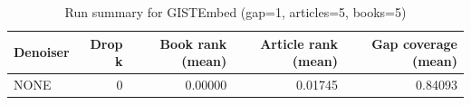 \begin{table}
\caption{Run summary for GISTEmbed (gap=1, articles=5, books=5)}
\label{tab:summary_gap1_gistembed_a5_b5}
\begin{tabular}{lrrrr}
\toprule
Denoiser & Drop k & Book rank (mean) & Article rank (mean) & Gap coverage (mean) \\
\midrule
NONE & 0 & 0.00000 & 0.01745 & 0.84093 \\
\bottomrule
\end{tabular}
\end{table}